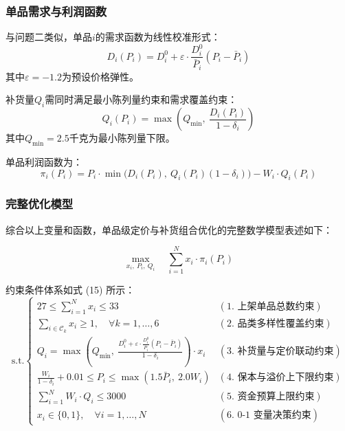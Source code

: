\documentclass[withoutpreface]{cumcmthesis}
\begin{document}
\subsubsection{单品需求与利润函数}

与问题二类似，单品$i$的需求函数为线性校准形式：
\begin{equation}
D_i(P_i) = D_i^0 + \varepsilon \cdot \frac{D_i^0}{\bar{P}_i} (P_i - \bar{P}_i)
\end{equation}
其中$\varepsilon = -1.2$为预设价格弹性。

补货量$Q_i$需同时满足最小陈列量约束和需求覆盖约束：
\begin{equation}
Q_i(P_i) = \max\left(Q_{\min},\ \frac{D_i(P_i)}{1-\delta_i}\right)
\end{equation}
其中$Q_{\min}=2.5$千克为最小陈列量下限。

单品利润函数为：
\begin{equation}
\pi_i(P_i) = P_i \cdot \min\bigl(D_i(P_i),\ Q_i(P_i)(1-\delta_i)\bigr) - W_i \cdot Q_i(P_i)
\end{equation}

\subsubsection{完整优化模型}

综合以上变量和函数，单品级定价与补货组合优化的完整数学模型表述如下：

\begin{equation}
\max_{x_i,\ P_i,\ Q_i} \quad \sum_{i=1}^{N} x_i \cdot \pi_i(P_i)
\end{equation}

约束条件体系如式 (15) 所示：
\begin{equation}
\text{s.t.} \begin{cases}
27 \le \sum_{i=1}^{N} x_i \le 33 & (\text{1. 上架单品总数约束}) \\[6pt]
\sum_{i \in \mathcal{C}_k} x_i \ge 1,\quad \forall k=1,\dots,6 & (\text{2. 品类多样性覆盖约束}) \\[6pt]
Q_i = \max\left(Q_{\min},\ \frac{D_i^0 + \varepsilon \cdot \frac{D_i^0}{\bar{P}_i} (P_i - \bar{P}_i)}{1-\delta_i}\right) \cdot x_i & (\text{3. 补货量与定价联动约束}) \\[6pt]
\frac{W_i}{1-\delta_i} + 0.01 \le P_i \le \max(1.5\bar{P}_i,\ 2.0W_i) & (\text{4. 保本与溢价上下限约束}) \\[6pt]
\sum_{i=1}^{N} W_i \cdot Q_i \le 3000 & (\text{5. 资金预算上限约束}) \\[6pt]
x_i \in \{0,1\},\quad \forall i=1,\dots,N & (\text{6. 0-1 变量决策约束})
\end{cases}
\end{equation}
\end{document}
